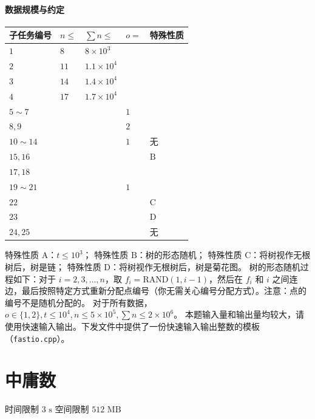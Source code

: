 \documentclass[12pt,a4paper,oneside]{ctexart}
\begin{document}
\paragraph{数据规模与约定}
\begin{center}\small
\begin{tabularx}{\textwidth}{|>{\centering\arraybackslash}X|>{\centering\arraybackslash}X|>{\centering\arraybackslash}X|>{\centering\arraybackslash}X|>{\centering\arraybackslash}X|}\hline
子任务编号 & $n \leq$ & $\sum n \leq$ & $o =$ & 特殊性质\\\hline
$1$ & $8$ & $8 \times 10^{3}$ & \multirow{4}{*}{$2$} & \multirow{6}{*}{$\text{A}$}\\\cline{1-3}
$2$ & $11$ & $1.1 \times 10^{4}$ &  & \\\cline{1-3}
$3$ & $14$ & $1.4 \times 10^{4}$ &  & \\\cline{1-3}
$4$ & $17$ & $1.7 \times 10^{4}$ &  & \\\cline{1-4}
$5 \sim 7$ & \multirow{2}{*}{$3 \times 10^{3}$} & \multirow{2}{*}{$3 \times 10^{4}$} & $1$ & \\\cline{1-1}\cline{4-4}
$8,9$ &  &  & $2$ & \\\hline
$10 \sim 14$ & \multirow{3}{*}{$1.5 \times 10^{5}$} & \multirow{3}{*}{$6 \times 10^{5}$} & $1$ & 无\\\cline{1-1}\cline{4-5}
$15,16$ &  &  & \multirow{2}{*}{$2$} & $\text{B}$\\\cline{1-1}\cline{5-5}
$17,18$ &  &  &  & \multirow{2}{*}{无}\\\cline{1-4}
$19 \sim 21$ & \multirow{4}{*}{$5 \times 10^{5}$} & \multirow{4}{*}{$2 \times 10^{6}$} & $1$ & \\\cline{1-1}\cline{4-5}
$22$ &  &  & \multirow{3}{*}{$2$} & $\text{C}$\\\cline{1-1}\cline{5-5}
$23$ &  &  &  & $\text{D}$\\\cline{1-1}\cline{5-5}
$24,25$ &  &  &  & 无\\\hline
\end{tabularx}
\end{center}
特殊性质 $\text{A}$：$t \leq 10^{3}$；
特殊性质 $\text{B}$：树的形态随机；
特殊性质 $\text{C}$：将树视作无根树后，树是链；
特殊性质 $\text{D}$：将树视作无根树后，树是菊花图。
树的形态随机过程如下：对于 $i = 2,3,\dots,n$，取 $f_{i} = \text{RAND}(1,i-1)$，然后在 $f_{i}$ 和 $i$ 之间连边，最后按照特定方式重新分配点编号（你无需关心编号分配方式）。注意：点的编号不是随机分配的。
对于所有数据，$o \in \{1,2\},t \leq 10^{4},n \leq 5 \times 10^{5}, \sum n \leq 2 \times 10^{6}$。
本题输入量和输出量均较大，请使用快速输入输出。下发文件中提供了一份快速输入输出整数的模板（\texttt{fastio.cpp}）。
\newpage\section{中庸数}
时间限制 $\text{3 s}$
空间限制 $\text{512 MB}$
\end{document}
